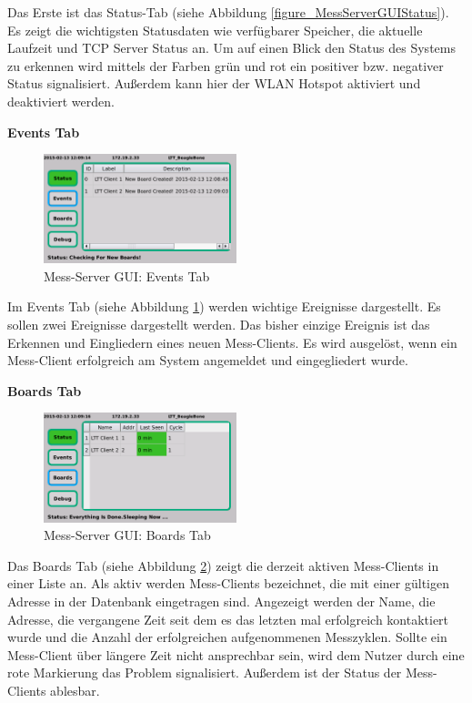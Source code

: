 Das Erste ist das Status-Tab (siehe Abbildung \ref{figure_MessServerGUIStatus}). Es zeigt die wichtigsten Statusdaten wie verfügbarer Speicher, die aktuelle Laufzeit und TCP Server Status an. Um auf einen Blick den Status des Systems zu erkennen wird mittels der Farben grün und rot ein positiver bzw. negativer Status signalisiert. Außerdem kann hier der WLAN Hotspot aktiviert und deaktiviert werden.

\textbf{Events Tab}

\begin{figure}[H]
\begin{center}
\includegraphics[width=0.5\textwidth ]{img/GUI/Server_GUI_Events1.png}
\caption{Mess-Server GUI: Events Tab}
\label{figure_MessServerGUIEvents}
\end{center}
\end{figure}

Im Events Tab (siehe Abbildung \ref{figure_MessServerGUIEvents}) werden wichtige Ereignisse dargestellt. Es sollen zwei Ereignisse dargestellt werden. Das bisher einzige Ereignis ist das Erkennen und Eingliedern eines neuen Mess-Clients. Es wird ausgelöst, wenn ein Mess-Client erfolgreich am System angemeldet und eingegliedert wurde. 

\textbf{Boards Tab}

\begin{figure}[H]
\begin{center}
\includegraphics[width=0.5\textwidth ]{img/GUI/Server_GUI_Boards1.png}
\caption{Mess-Server GUI: Boards Tab}
\label{figure_MessServerGUIBoards}
\end{center}
\end{figure}

Das Boards Tab (siehe Abbildung \ref{figure_MessServerGUIBoards}) zeigt die derzeit aktiven Mess-Clients in einer Liste an. Als aktiv werden Mess-Clients bezeichnet, die mit einer gültigen Adresse in der Datenbank eingetragen sind. Angezeigt werden der Name, die Adresse, die vergangene Zeit seit dem es das letzten mal erfolgreich kontaktiert wurde und die Anzahl der erfolgreichen aufgenommenen Messzyklen. Sollte ein Mess-Client über längere Zeit nicht ansprechbar sein, wird dem Nutzer durch eine rote Markierung das Problem signalisiert. Außerdem ist der Status der Mess-Clients ablesbar.

